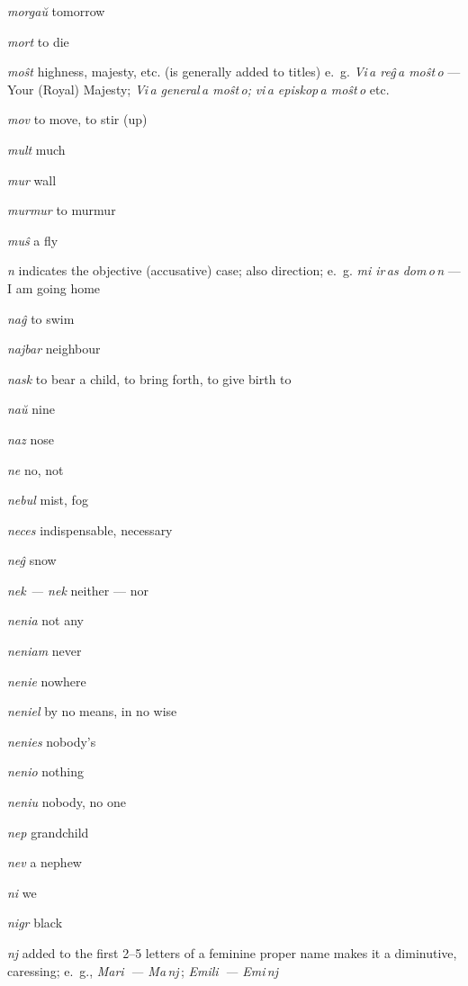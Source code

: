 \begin{landscape}
\begin{multicols}{5}
\begin{outdent}{1em}
\emph{morgaŭ } tomorrow

\emph{mort } to die

\emph{moŝt}  highness, majesty, etc. (is generally added to titles) e.~g. \emph{Vi\,a reĝ\,a moŝt\,o} —  Your (Royal) Majesty; \emph{Vi\,a general\,a moŝt\,o;} \emph{vi\,a episkop\,a moŝt\,o} etc.

\emph{mov}  to move, to stir (up)

\emph{mult } much

\emph{mur}  wall

\emph{murmur}  to murmur

\emph{muŝ } a fly
\end{outdent}


\begin{outdent}{1em}
\emph{n  }indicates the objective (accusative) case; also direction; e.~g. \emph{mi ir\,as dom\,o\,n} — I am going home

\emph{naĝ}  to swim

\emph{najbar}  neighbour

\emph{nask}  to bear a child, to bring forth, to give birth to

\emph{naŭ } nine

\emph{naz}  nose

\emph{ne}  no, not

\emph{nebul}  mist, fog

\emph{neces}  indispensable, necessary

\emph{neĝ}  snow

\emph{nek — nek}  neither — nor

\emph{nenia}  not any

\emph{neniam}  never

\emph{nenie}  nowhere

\emph{neniel}  by no means, in no wise

\emph{nenies}  nobody’s

\emph{nenio}  nothing

\emph{neniu}  nobody, no one

\emph{nep}  grandchild

\emph{nev}  a nephew

\emph{ni}  we

\emph{nigr}  black

\emph{nj}  added to the first 2--5 letters of a feminine proper name makes it a diminutive, caressing; e.~g., \emph{Mari\, — Ma\,nj\,}; \emph{Emili\, — Emi\,nj\,}


\end{outdent}
\end{multicols}
\end{landscape}
